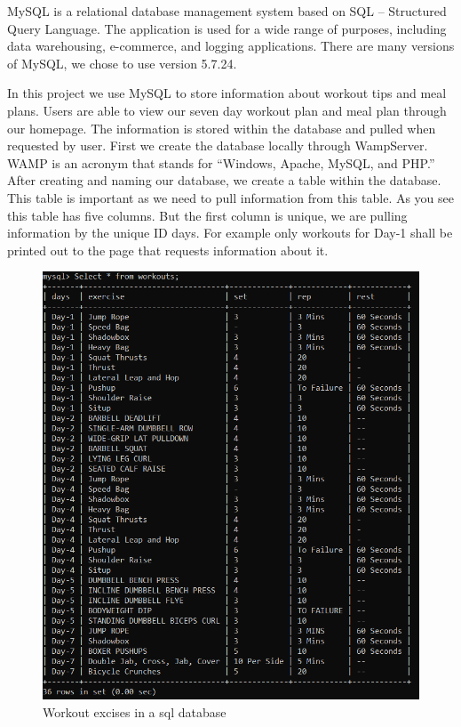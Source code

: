 \documentclass[a4paper,12pt]{report}
\begin{document}
MySQL is a relational database management system based on SQL – Structured Query Language. The application is used for a wide range of purposes, including data warehousing, e-commerce, and logging applications. There are many versions of MySQL, we chose to use version 5.7.24.

In this project we use MySQL to store information about workout tips and meal plans. Users are able to view our seven day workout plan and meal plan through our homepage. The information is stored within the database and pulled when requested by user.
First we create the database locally through WampServer. WAMP is an acronym that stands for “Windows, Apache, MySQL, and PHP.” After creating and naming our database, we create a table within the database. 
This table is important as we need to pull information from this table. As you see this table has five columns. But the first column is unique, we are pulling information by the unique ID days. For example only workouts for Day-1 shall be printed out to the page that requests information about it.

\begin{figure}[h]
    \begin{center}
    \includegraphics[scale=.56]{images/workouts-table.PNG}
    \caption{Workout excises in a sql database}
    \label{fig:MYSQL}
    \end{center}
\end{figure}
\end{document}
